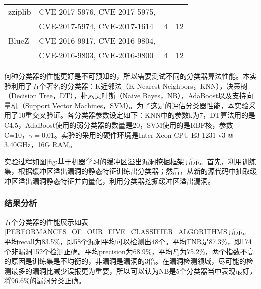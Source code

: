 {\begin{table}[ht]
\begin{center}
\begin{small}
\begin{tabular}{llll}
zziplib & CVE-2017-5976, CVE-2017-5975,\\ & CVE-2017-5974, CVE-2017-1614 & 4 & 12\\ \hline

BlueZ & CVE-2016-9917, CVE-2016-9804,\\ & CVE-2016-9803,  CVE-2016-9800 & 4 & 12\\ \hline
\end{tabular}
\end{small}
\end{center}
\end{table}

何种分类器的性能更好是不可预知的，所以需要测试不同的分类器算法性能。本实验利用了五个著名的分类器：K近邻法（K-Nearest Neighbors，KNN），决策树（Decision Tree，DT），朴素贝叶斯（Naive Bayes，NB），AdaBoost以及支持向量机（Support Vector Machines，SVM）。为了这是的评估分类器性能，本实验采用了10重交叉验证。各分类器参数设定如下：KNN中的参数k为7，DT算法用的是C4.5，AdaBoost使用的弱分类器的数量是20，SVM使用的是RBF核，参数C=10，$\gamma = 0.01$。实验的采用的硬件环境是Inter Xeon CPU E3-1231 v3 @ 3.40GHz，16G RAM。

实验过程如图\ref{fig:基于机器学习的缓冲区溢出漏洞挖掘框架}所示。首先，利用训练集，根据缓冲区溢出漏洞的静态特征训练出分类器；然后，从新的源代码中抽取缓冲区溢出漏洞静态特征并向量化，利用分类器挖掘缓冲区溢出漏洞。

\subsubsection{结果分析}

五个分类器的性能展示如表\ref{PERFORMANCES_OF_OUR_FIVE_CLASSIFIER_ALGORITHMS}所示。平均recall为83.5\%，即58个漏洞平均可以检测出48个。平均TNR是87.3\%，即174个非漏洞152个检测正确。平均precision为68.9\%，平均$F_1$为75.2\%，两个指数不高的原因是训练集是不均衡的，非漏洞是漏洞的3倍。在漏洞检测领域，尽可能的检测最多的漏洞比减少误报更为重要，所以可以认为NB是5个分类器当中表现最好，将96.6\%的漏洞分类正确。

}
